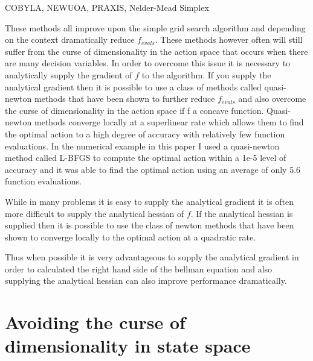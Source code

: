 \documentclass[12pt]{article}
\begin{document}
COBYLA, NEWUOA, PRAXIS, Nelder-Mead Simplex

These methods all improve upon the simple grid search algorithm and depending on the context dramatically reduce $f_{evals}$. These methods however often will still suffer from the curse of dimensionality in the action space that occurs when there are many decision variables. In order to overcome this issue it is necessary to analytically supply the gradient of $f$ to the algorithm. If you supply the analytical gradient then it is possible to use a class of methods called quasi-newton methods that have been shown to further reduce $f_{evals}$ and also overcome the curse of dimensionality in the action space if f a concave function. Quasi-newton methods converge locally at a superlinear rate which allows them to find the optimal action to a high degree of accuracy with relatively few function evaluations. In the numerical example in this paper I used a quasi-newton method called L-BFGS to compute the optimal action within a 1e-5 level of accuracy and it was able to find the optimal action using an average of only 5.6 function evaluations.

While in many problems it is easy to supply the analytical gradient it is often more difficult to supply the analytical hessian of $f$. If the analytical hessian is supplied then it is possible to use the class of newton methods that have been shown to converge locally to the optimal action at a quadratic rate.

Thus when possible it is very advantageous to supply the analytical gradient in order to calculated the right hand side of the bellman equation and also supplying the analytical hessian can also improve performance dramatically.

\section{Avoiding the curse of dimensionality in state space}
\end{document}
